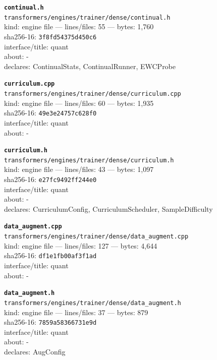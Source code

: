 \noindent\textbf{\texttt{continual.h}}\\
\texttt{transformers/engines/trainer/dense/continual.h}\\
kind: engine file --- lines/files: 55 --- bytes: 1,760\\
sha256-16: \texttt{3f8fd54375d450c6}\\
interface/title: quant\\
about: -\\
declares: ContinualStats, ContinualRunner, EWCProbe\\
\vspace*{6.0pt}

\noindent\textbf{\texttt{curriculum.cpp}}\\
\texttt{transformers/engines/trainer/dense/curriculum.cpp}\\
kind: engine file --- lines/files: 60 --- bytes: 1,935\\
sha256-16: \texttt{49e3e24757c628f0}\\
interface/title: quant\\
about: -\\
\vspace*{6.0pt}

\noindent\textbf{\texttt{curriculum.h}}\\
\texttt{transformers/engines/trainer/dense/curriculum.h}\\
kind: engine file --- lines/files: 43 --- bytes: 1,097\\
sha256-16: \texttt{e27fc9492ff244e0}\\
interface/title: quant\\
about: -\\
declares: CurriculumConfig, CurriculumScheduler, SampleDifficulty\\
\vspace*{6.0pt}
\newpage

\noindent\textbf{\texttt{data\_augment.cpp}}\\
\texttt{transformers/engines/trainer/dense/data\_augment.cpp}\\
kind: engine file --- lines/files: 127 --- bytes: 4,644\\
sha256-16: \texttt{df1e1fb00af3f1ad}\\
interface/title: quant\\
about: -\\
\vspace*{6.0pt}

\noindent\textbf{\texttt{data\_augment.h}}\\
\texttt{transformers/engines/trainer/dense/data\_augment.h}\\
kind: engine file --- lines/files: 37 --- bytes: 879\\
sha256-16: \texttt{7859a58366731e9d}\\
interface/title: quant\\
about: -\\
declares: AugConfig\\
\vspace*{6.0pt}

